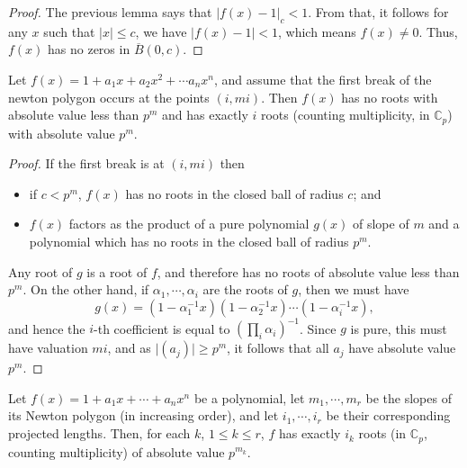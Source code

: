 \begin{proof}
  The previous lemma says that $\lvert f(x) - 1 \rvert_c < 1$. From that, it follows for any $x$ such
  that $\lvert x \rvert \leq c$, we have $\lvert f(x) - 1 \rvert < 1$, which means $f(x) \neq 0$.
  Thus, $f(x)$ has no zeros in $\overline{B}(0,c)$.
\end{proof}



\begin{proposition}
  Let $f(x) = 1 + a_1 x + a_2 x^2 + \cdots a_n x^n$, and assume that the first break of the newton
  polygon occurs at the points $(i,mi)$. Then $f(x)$ has no roots with absolute value less than $p^m$
  and has exactly $i$ roots (counting multiplicity, in $\mathbb{C}_p$) with absolute value $p^m$.
\end{proposition}

\begin{proof}
  If the first break is at $(i,mi)$ then
  \begin{itemize}
    \item if $c < p^m$, $f(x)$ has no roots in the closed ball of radius $c$; and
    \item $f(x)$ factors as the product of a pure polynomial $g(x)$ of slope of $m$ and a polynomial
      which has no roots in the closed ball of radius $p^m$.
  \end{itemize}
  Any root of $g$ is a root of $f$, and therefore has no roots of absolute value less than $p^m$. On
  the other hand, if $\alpha_1, \cdots, \alpha_i$ are the roots of $g$, then we must have
  \[
    g(x) = (1 - \alpha_1^{-1}x) (1 - \alpha_2^{-1}x) \cdots (1 - \alpha_i^{-1}x),
  \]
  and hence the $i$-th coefficient is equal to $(\prod_i \alpha_i)^{-1}$. Since $g$ is pure, this
  must have valuation $mi$, and as $\lvert (a_j) \rvert \geq p^m$, it follows that all $a_j$ have
  absolute value $p^m$.
\end{proof}

\begin{theorem}
  Let $f(x) = 1 + a_1 x + \cdots + a_n x^n$ be a polynomial, let $m_1, \cdots, m_r$ be the slopes
  of its Newton polygon (in increasing order), and let $i_1, \cdots, i_r$ be their corresponding
  projected lengths. Then, for each $k$, $1 \leq k \leq r$, $f$ has exactly $i_k$ roots
  (in $\mathbb{C}_p$, counting multiplicity) of absolute value $p^{m_k}$.
\end{theorem}

